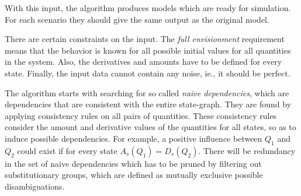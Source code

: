 \documentclass{article} %
\begin{document}
With this input, the algorithm produces models which are ready for simulation.
For each scenario they should give the same output as the original model.

There are certain constraints on the input. The \emph{full envisionment}
requirement means that the behavior is known for all possible initial values
for all quantities in the system. Also, the derivatives and amounts have to be
defined for every state. Finally, the input data cannot contain any noise,
ie., it should be perfect.

The algorithm starts with searching for so called \emph{naive dependencies},
which are dependencies that are consistent with the entire state-graph. They
are found by applying consistency rules on all pairs of quantities. These
consistency rules consider the amount and derivative values of the quantities
for all states, so as to induce possible dependencies. For example, a positive
influence between $Q_1$ and $Q_2$ could exist if for every state $A_s(Q_1) =
D_s(Q_2)$.  There will be redundancy in the set of naive dependencies which
has to be pruned by filtering out substitutionary groups, which are defined as
mutually exclusive possible disambiguations. 

%





\newpage
\end{document}
